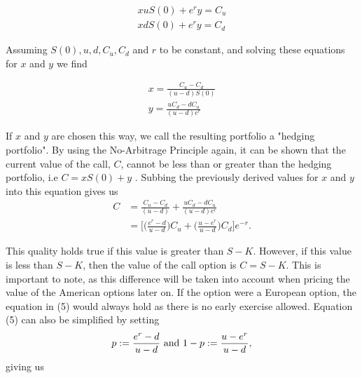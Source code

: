 \documentclass[letterpaper,12pt]{article}
\theoremstyle{plain}
\numberwithin{equation}{section}
\begin{document}
\begin{equation*}
\begin{aligned}
	x u S(0) + e^r y  = C_u \\
x d S(0) + e^r y = C_d
\end{aligned}
\end{equation*}

Assuming $S(0), u, d, C_u, C_d$ and $r$ to be constant, and solving these equations for $x$ and $y$ we find


\begin{equation}
\begin{aligned}
	x = \frac{C_u - C_d}{(u-d)S(0)} \\
	y = \frac{uC_d - dC_u}{(u-d)e^r}
\end{aligned}
\end{equation}

If $x$ and $y$ are chosen this way, we call the resulting portfolio a "hedging portfolio". By using the No-Arbitrage Principle again, it can be shown that the current value of the call, $C$, cannot be less than or greater than the hedging portfolio, i.e $C = xS(0) + y$ \cite{CRR}. Subbing the previously derived values for $x$ and $y$ into this equation gives us
\begin{equation}
\begin{aligned}
	C & = \frac{C_u - C_d}{(u-d)} +\frac{uC_d - dC_u}{(u-d)e^r} \\
	& = \bigg [ \bigg(\frac{e^r-d}{u-d} \bigg)C_u + \bigg( \frac{u-e^r}{u-d} \bigg)C_d\bigg]e^{-r}.
\end{aligned}
\end{equation}

This quality holds true if this value is greater than $S-K$. However, if this value is less than $S-K$, then the value of the call option is $C = S-K$. This is important to note, as this difference will be taken into account when pricing the value of the American options later on. If the option were a European option, the equation in (5) would always hold as there is no early exercise allowed. Equation (5) can also be simplified by setting
\begin{equation*}
	p := \frac{e^r - d}{u-d} \space \text{ and } 1-p := \frac{u-e^r}{u-d},
\end{equation*}
giving us
\end{document}
